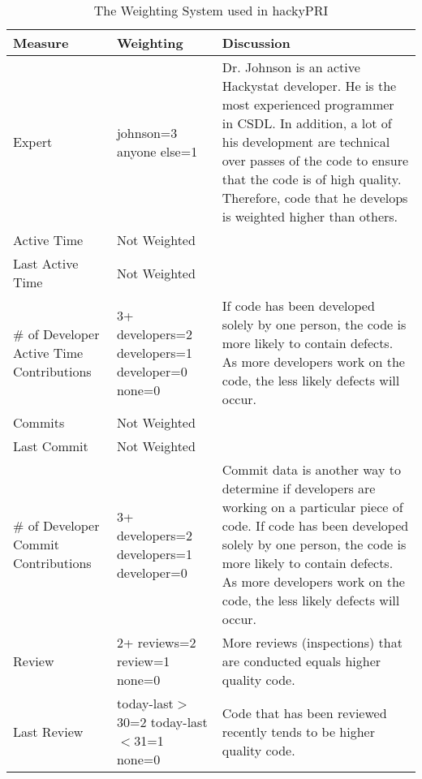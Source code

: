 \begin{table}[htbp]
  \begin{center}
    \caption{The Weighting System used in hackyPRI}
    \label{table:weighting-hackyPRI}
    \begin{tabular}{|p{2.5cm}|p{3.0cm}|p{8.0cm}|} \hline
      {\bf Measure} & {\bf Weighting} & {\bf Discussion} \\ \hline
\small{}Expert & \small{}johnson=3 \newline anyone else=1 &
\small{}Dr. Johnson is an active Hackystat developer. He is the most
experienced programmer in CSDL. In addition, a lot of his development are
technical over passes of the code to ensure that the code is of high
quality. Therefore, code that he develops is weighted higher than
others. \\ \hline

\small{}Active Time & \small{}Not Weighted  &  \\ \hline
\small{}Last Active Time & \small{}Not Weighted & \\ \hline
\small{}\# of Developer \newline Active Time \newline Contributions & 
\small{}3+ developers=2 \newline 2 developers=1 \newline 1 developer=0
\newline none=0 & \small{}If code has been developed solely by one
person, the code is more likely to contain defects. As more developers work 
on the code, the less likely defects will occur. \\ \hline

\small{}Commits & \small{}Not Weighted & \\ \hline
\small{}Last Commit & \small{}Not Weighted & \\ \hline
\small{}\# of Developer \newline Commit \newline Contributions & \small{} 
\small{}3+ developers=2 \newline 2 developers=1 \newline 1 developer=0 &
\small{}Commit data is another way to determine if developers are working
on a particular piece of code. If code has been developed solely by one
person, the code is more likely to contain defects. As more developers work
on the code, the less likely defects will occur. \\ \hline

\small{}Review & \small{}2+ reviews=2 \newline 1 review=1 \newline none=0 & 
More reviews (inspections) that are conducted equals higher quality code. \\ \hline
\small{}Last Review & \small{}today-last$>$30=2 \newline today-last$<$31=1
\newline none=0 & \small{}Code that has been reviewed recently tends to be
higher quality code. \\ \hline 


\end{tabular}
\end{center}
\end{table}
